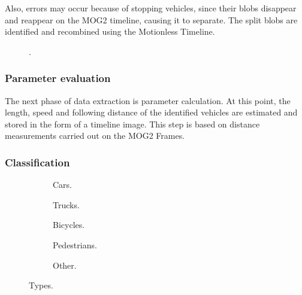 Also, errors may occur because of stopping vehicles, since their blobs disappear and reappear on the MOG2 timeline, causing it to separate.
The split blobs are identified and recombined using the Motionless Timeline. 

\begin{figure}[!h]
	\centering
	
	\caption{.\label{fig:size_speed_following_distance}}
\end{figure}

\subsubsection{Parameter evaluation}
The next phase of data extraction is parameter calculation.
At this point, the length, speed and following distance of the identified vehicles are estimated and stored in the form of a timeline image.
This step is based on distance measurements carried out on the MOG2 Frames.

\subsubsection{Classification}
\begin{figure}[!h]
	\centering
	\begin{subfigure}[!h]{0.25\textwidth}
	
	\caption{Cars.}
	\end{subfigure}
	\quad
	\begin{subfigure}[!h]{0.25\textwidth}
	
	\caption{Trucks.}
	\end{subfigure}
	\quad
	\begin{subfigure}[!h]{0.21\textwidth}
	
	\caption{Bicycles.}
	\end{subfigure}
	\hfill
	\begin{subfigure}[!h]{0.3\textwidth}
	
	\caption{Pedestrians.}
	\end{subfigure}
	\quad
	\begin{subfigure}[!h]{0.5\textwidth}
	
	\caption{Other.}
	\end{subfigure}

	\caption{Types.\label{fig:types}}
\end{figure}



